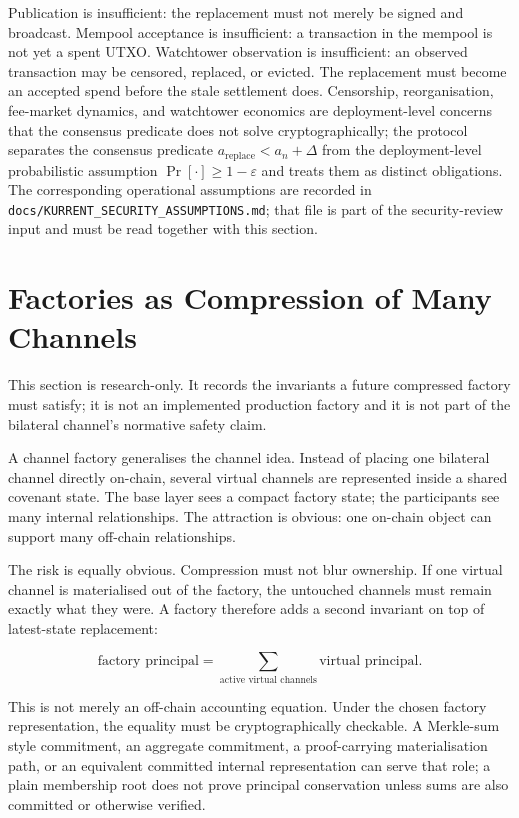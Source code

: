 \documentclass[10pt,a4paper]{article}
\begin{document}
Publication is insufficient: the replacement must not merely be signed and broadcast. Mempool acceptance is insufficient: a transaction in the mempool is not yet a spent UTXO. Watchtower observation is insufficient: an observed transaction may be censored, replaced, or evicted. The replacement must become an accepted spend before the stale settlement does. Censorship, reorganisation, fee-market dynamics, and watchtower economics are deployment-level concerns that the consensus predicate does not solve cryptographically; the protocol separates the consensus predicate $a_{\mathrm{replace}} < a_n + \Delta$ from the deployment-level probabilistic assumption $\Pr[\cdot] \ge 1 - \varepsilon$ and treats them as distinct obligations.
The corresponding operational assumptions are recorded in
\texttt{docs/KURRENT\_SECURITY\_ASSUMPTIONS.md}; that file is part of the
security-review input and must be read together with this section.

\section{Factories as Compression of Many Channels}
\label{sec:factory}

This section is research-only. It records the invariants a future compressed factory must satisfy; it is not an implemented production factory and it is not part of the bilateral channel's normative safety claim.

A channel factory \cite{channelFactories} generalises the channel idea. Instead of placing one bilateral channel directly on-chain, several virtual channels are represented inside a shared covenant state. The base layer sees a compact factory state; the participants see many internal relationships. The attraction is obvious: one on-chain object can support many off-chain relationships.

The risk is equally obvious. Compression must not blur ownership. If one virtual channel is materialised out of the factory, the untouched channels must remain exactly what they were. A factory therefore adds a second invariant on top of latest-state replacement:

\[
  \text{factory principal}
  =
  \sum_{\text{active virtual channels}} \text{virtual principal}.
\]

This is not merely an off-chain accounting equation. Under the chosen factory representation, the equality must be cryptographically checkable. A Merkle-sum style commitment, an aggregate commitment, a proof-carrying materialisation path, or an equivalent committed internal representation can serve that role; a plain membership root does not prove principal conservation unless sums are also committed or otherwise verified.
\end{document}
